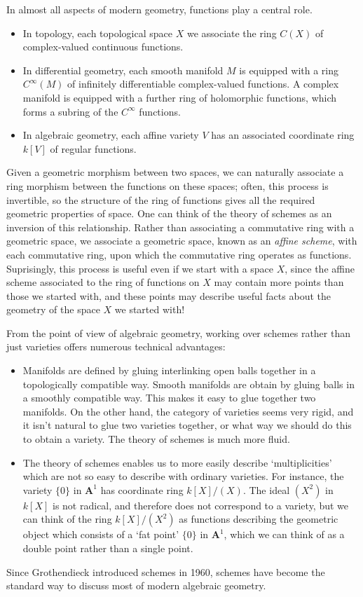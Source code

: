 In almost all aspects of modern geometry, functions play a central role.
%
\begin{itemize}
    \item In topology, each topological space $X$ we associate the ring $C(X)$ of complex-valued continuous functions.
    \item In differential geometry, each smooth manifold $M$ is equipped with a ring $C^\infty(M)$ of infinitely differentiable complex-valued functions. A complex manifold is equipped with a further ring of holomorphic functions, which forms a subring of the $C^\infty$ functions.
    \item In algebraic geometry, each affine variety $V$ has an associated coordinate ring $k[V]$ of regular functions.
\end{itemize}
%
Given a geometric morphism between two spaces, we can naturally associate a ring morphism between the functions on these spaces; often, this process is invertible, so the structure of the ring of functions gives all the required geometric properties of space. One can think of the theory of schemes as an inversion of this relationship. Rather than associating a commutative ring with a geometric space, we associate a geometric space, known as an {\it affine scheme}, with each commutative ring, upon which the commutative ring operates as functions. Suprisingly, this process is useful even if we start with a space $X$, since the affine scheme associated to the ring of functions on $X$ may contain more points than those we started with, and these points may describe useful facts about the geometry of the space $X$ we started with!

From the point of view of algebraic geometry, working over schemes rather than just varieties offers numerous technical advantages:
%
\begin{itemize}
    \item Manifolds are defined by gluing interlinking open balls together in a topologically compatible way. Smooth manifolds are obtain by gluing balls in a smoothly compatible way. This makes it easy to glue together two manifolds. On the other hand, the category of varieties seems very rigid, and it isn't natural to glue two varieties together, or what way we should do this to obtain a variety. The theory of schemes is much more fluid.

    \item The theory of schemes enables us to more easily describe `multiplicities' which are not so easy to describe with ordinary varieties. For instance, the variety $\{ 0 \}$ in $\mathbf{A}^1$ has coordinate ring $k[X]/(X)$. The ideal $(X^2)$ in $k[X]$ is not radical, and therefore does not correspond to a variety, but we can think of the ring $k[X]/(X^2)$ as functions describing the geometric object which consists of a `fat point' $\{ 0 \}$ in $\mathbf{A}^1$, which we can think of as a double point rather than a single point.
\end{itemize}
%
Since Grothendieck introduced schemes in 1960, schemes have become the standard way to discuss most of modern algebraic geometry.

